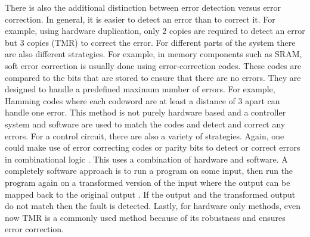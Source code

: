 \documentclass[12pt]{report}
\begin{document}
There is also the additional distinction between error detection versus error correction. In general, it is easier to detect an error than to correct it. For example, using hardware duplication, only 2 copies are required to detect an error but 3 copies (TMR) to correct the error. For different parts of the system there are also different strategies. For example, in memory components such as SRAM, soft error correction is usually done using error-correction codes. These codes are compared to the bits that are stored to ensure that there are no errors. They are designed to handle a predefined maximum number of errors. For example, Hamming codes where each codeword are at least a distance of 3 apart can handle one error. This method is not purely hardware based and a controller system and software are used to match the codes and detect and correct any errors. For a control circuit, there are also a variety of strategies. Again, one could make use of error correcting codes or parity bits to detect or correct errors in combinational logic \cite{McCluskey_99}. This uses a combination of hardware and software. A completely software approach is to run a program on some input, then run the program again on a transformed version of the input where the output can be mapped back to the original output \cite{Mitra_softwareerror}. If the output and the transformed output do not match then the fault is detected. Lastly, for hardware only methods, even now TMR is a commonly used method because of its robustness and ensures error correction. \\
\end{document}
